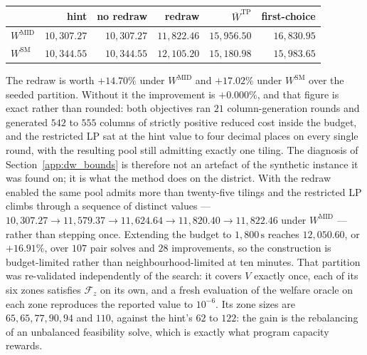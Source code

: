 \documentclass{article}
\begin{document}
\begin{center}
\begin{tabular}{lrrrrr}
\hline
& hint & no redraw & redraw & $\overline W^{\mathrm{TP}}$ & first-choice \\
\hline
$W^{\text{MID}}$ & $10{,}307.27$ & $10{,}307.27$ & $11{,}822.46$ & $15{,}956.50$ & $16{,}830.95$ \\
$W^{\text{SM}}$  & $10{,}344.55$ & $10{,}344.55$ & $12{,}105.20$ & $15{,}180.98$ & $15{,}983.65$ \\
\hline
\end{tabular}
\end{center}

The redraw is worth $+14.70\%$ under $W^{\text{MID}}$ and $+17.02\%$ under
$W^{\text{SM}}$ over the seeded partition. Without it the improvement is
$+0.000\%$, and that figure is exact rather than rounded: both objectives ran
$21$ column-generation rounds and generated $542$ to $555$ columns of strictly
positive reduced cost inside the budget, and the restricted LP sat at the hint
value to four decimal places on every single round, with the resulting pool
still admitting exactly one tiling. The diagnosis of
Section~\ref{app:dw_bounds} is therefore not an artefact of the synthetic
instance it was found on; it is what the method does on the district. With the
redraw enabled the same pool admits more than twenty-five tilings and the
restricted LP climbs through a sequence of distinct values ---
$10{,}307.27 \to 11{,}579.37 \to 11{,}624.64 \to 11{,}820.40 \to 11{,}822.46$
under $W^{\text{MID}}$ --- rather than stepping once. Extending the budget to
$1{,}800\,\mathrm{s}$ reaches $12{,}050.60$, or $+16.91\%$, over $107$ pair
solves and $28$ improvements, so the construction is budget-limited rather than
neighbourhood-limited at ten minutes. That partition was re-validated
independently of the search: it covers $V$ exactly once, each of its six zones
satisfies $\mathcal F_z$ on its own, and a fresh evaluation of the welfare
oracle on each zone reproduces the reported value to $10^{-6}$. Its zone sizes
are $65, 65, 77, 90, 94$ and $110$, against the hint's $62$ to $122$: the gain
is the rebalancing of an unbalanced feasibility solve, which is exactly what
program capacity rewards.
\end{document}
